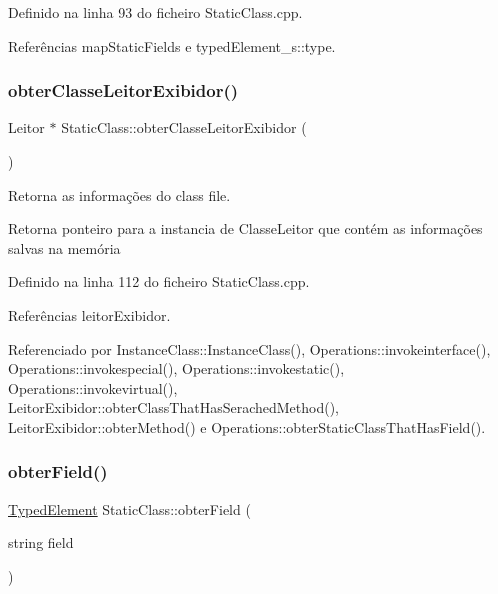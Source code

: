 Definido na linha 93 do ficheiro Static\+Class.\+cpp.



Referências map\+Static\+Fields e typed\+Element\+\_\+s\+::type.

\mbox{\label{classStaticClass_ae028bd9e2b93b69b91b22348a0b4848d}} 
\subsubsection{\texorpdfstring{obter\+Classe\+Leitor\+Exibidor()}{obterClasseLeitorExibidor()}}
{\footnotesize\ttfamily Leitor $\ast$ Static\+Class\+::obter\+Classe\+Leitor\+Exibidor (\begin{DoxyParamCaption}{ }\end{DoxyParamCaption})}



Retorna as informações do class file. 

\begin{DoxyReturn}{Retorna}
ponteiro para a instancia de Classe\+Leitor que contém as informações salvas na memória 
\end{DoxyReturn}


Definido na linha 112 do ficheiro Static\+Class.\+cpp.



Referências leitor\+Exibidor.



Referenciado por Instance\+Class\+::\+Instance\+Class(), Operations\+::invokeinterface(), Operations\+::invokespecial(), Operations\+::invokestatic(), Operations\+::invokevirtual(), Leitor\+Exibidor\+::obter\+Class\+That\+Has\+Serached\+Method(), Leitor\+Exibidor\+::obter\+Method() e Operations\+::obter\+Static\+Class\+That\+Has\+Field().

\mbox{\label{classStaticClass_ac6d7d4b5b1c315623a8be477c66f38c3}} 
\subsubsection{\texorpdfstring{obter\+Field()}{obterField()}}
{\footnotesize\ttfamily \hyperlink{BasicTypes_8h_a97b332303b1262282599e6ede0637b82}{Typed\+Element} Static\+Class\+::obter\+Field (\begin{DoxyParamCaption}\item[{string}]{field }\end{DoxyParamCaption})}



